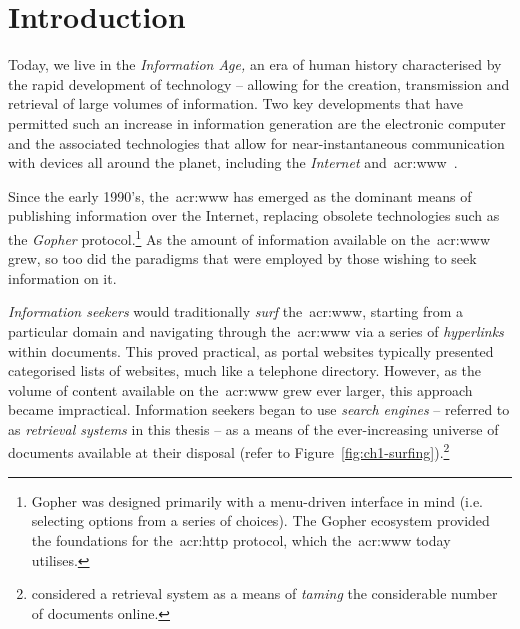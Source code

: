 
\chapter{Introduction}\label{chap:intro}
Today, we live in the \emph{Information Age,} an era of human history characterised by the rapid development of technology -- allowing for the creation, transmission and retrieval of large volumes of information. Two key developments that have permitted such an increase in information generation are the electronic computer and the associated technologies that allow for near-instantaneous communication with devices all around the planet, including the \emph{Internet} and~\gls{acr:www}~\citep{berners1994www}.

\begin{figure}[h]
    \centering
    \vspace{5mm}
    \label{fig:earth_satellites}
    \vspace{-4mm}
\end{figure}

Since the early 1990's, the~\gls{acr:www} has emerged as the dominant means of publishing information over the Internet, replacing obsolete technologies such as the \emph{Gopher} protocol.\footnote{Gopher was designed primarily with a menu-driven interface in mind (i.e. selecting options from a series of choices). The Gopher ecosystem provided the foundations for the~\gls{acr:http} protocol, which the~\gls{acr:www} today utilises.} As the amount of information available on the~\gls{acr:www} grew, so too did the paradigms that were employed by those wishing to seek information on it.

\emph{Information seekers} would traditionally \emph{surf} the~\gls{acr:www}, starting from a particular domain and navigating through the~\gls{acr:www} via a series of \emph{hyperlinks} within documents. This proved practical, as portal websites typically presented categorised lists of websites, much like a telephone directory. However, as the volume of content available on the~\gls{acr:www} grew ever larger, this approach became impractical. Information seekers began to use \emph{search engines} -- referred to as \emph{retrieval systems} in this thesis -- as a means of  the ever-increasing universe of documents available at their disposal (refer to Figure~\ref{fig:ch1-surfing}).\footnote{\cite{mcbryan1994taming_tools} considered a retrieval system as a means of \emph{taming} the considerable number of documents online.}

